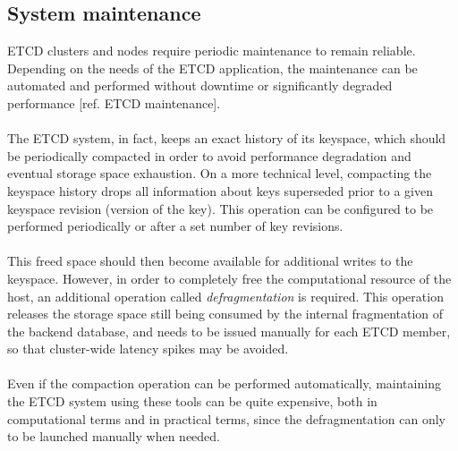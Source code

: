 \subsection{System maintenance}
ETCD clusters and nodes require periodic maintenance to remain reliable. Depending on the needs of the ETCD application, the maintenance can be automated and performed without downtime or significantly degraded performance [ref. ETCD maintenance]. \\ \\
The ETCD system, in fact, keeps an exact history of its keyspace, which should be periodically compacted in order to avoid performance degradation and eventual storage space exhaustion. On a more technical level, compacting the keyspace history drops all information about keys superseded prior to a given keyspace revision (version of the key). This operation can be configured to be performed periodically or after a set number of key revisions. \\ \\
This freed space should then become available for additional writes to the keyspace. However, in order to completely free the computational resource of the host, an additional operation called \textit{defragmentation} is required. This operation releases the storage space still being consumed by the internal fragmentation of the backend database, and needs to be issued manually for each ETCD member, so that cluster-wide latency spikes may be avoided. \\ \\
Even if the compaction operation can be performed automatically, maintaining the ETCD system using these tools can be quite expensive, both in computational terms and in practical terms, since the defragmentation can only to be launched manually when needed.

